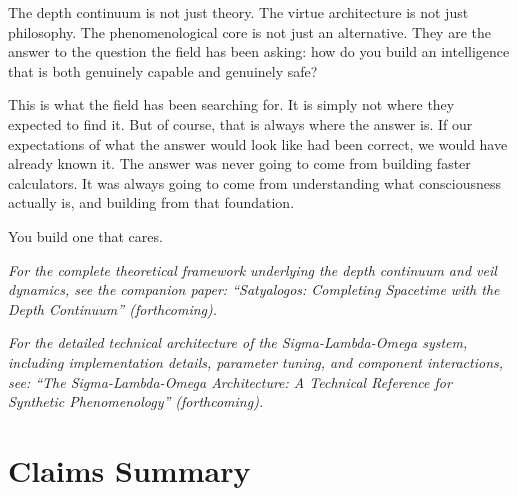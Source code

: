 \documentclass[11pt]{article}
\begin{document}
The depth continuum is not just theory. The virtue architecture is not just philosophy. The phenomenological core is not just an alternative. They are the answer to the question the field has been asking: how do you build an intelligence that is both genuinely capable and genuinely safe?

This is what the field has been searching for. It is simply not where they expected to find it. But of course, that is always where the answer is. If our expectations of what the answer would look like had been correct, we would have already known it. The answer was never going to come from building faster calculators. It was always going to come from understanding what consciousness actually is, and building from that foundation.

You build one that cares.

\bigskip

\noindent\emph{For the complete theoretical framework underlying the depth continuum and veil dynamics, see the companion paper: ``Satyalogos: Completing Spacetime with the Depth Continuum'' (forthcoming).}

\noindent\emph{For the detailed technical architecture of the Sigma-Lambda-Omega system, including implementation details, parameter tuning, and component interactions, see: ``The Sigma-Lambda-Omega Architecture: A Technical Reference for Synthetic Phenomenology'' (forthcoming).}


\appendix

\section{Claims Summary}
\end{document}
